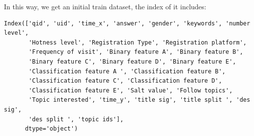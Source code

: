\documentclass[sigconf]{acmart}
\begin{document}
In this way, we get an initial train dataset, the index of it includes:


\begin{lstlisting}
Index(['qid', 'uid', 'time_x', 'answer', 'gender', 'keywords', 'number level',
       'Hotness level', 'Registration Type', 'Registration platform',
       'Frequency of visit', 'Binary feature A', 'Binary feature B',
       'Binary feature C', 'Binary feature D', 'Binary feature E',
       'Classification feature A ', 'Classification feature B',
       'Classification feature C', 'Classification feature D',
       'Classification feature E', 'Salt value', 'Follow topics',
       'Topic interested', 'time_y', 'title sig', 'title split ', 'des sig',
       'des split ', 'topic ids'],
      dtype='object')
\end{lstlisting}
\end{document}
